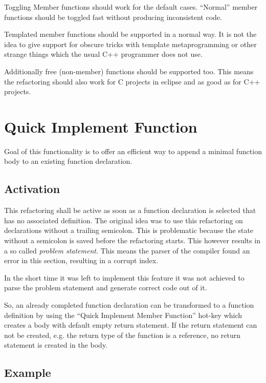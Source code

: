 Toggling Member functions should work for the default cases. ``Normal'' member
functions should be toggled fast without producing inconsistent code. 

Templated member functions should be supported in a normal way. It is not the
idea to give support for obscure tricks with template metaprogramming or other
strange things which the usual C++ programmer does not use. 

Additionally free (non-member) functions should be supported too. This means the
refactoring should also work for C projects in eclipse and as good as for C++
projects.

\section{Quick Implement Function}

Goal of this functionality is to offer an efficient way to append a minimal
function body to an existing function declaration.

\subsection{Activation}
This refactoring shall be active as soon as a function declaration is selected 
that has no associated definition. The original idea was to use this
refactoring on declarations without a trailing semicolon. This is problematic
because the state without a semicolon is saved before the refactoring starts.
This however results in a so called \textit{problem statement}. This means the
parser of the compiler found an error in this section, resulting in a corrupt
index.\newline

In the short time it was left to implement this feature it was not achieved to
parse the problem statement and generate correct code out of it.\newline 

So, an already completed function declaration can be transformed to a function
definition by using the ``Quick Implement Member Function'' hot-key which
creates a body with default empty return statement. If the return statement can
not be created, e.g. the return type of the function is a reference, no return
statement is created in the body.

\subsection*{Example}

